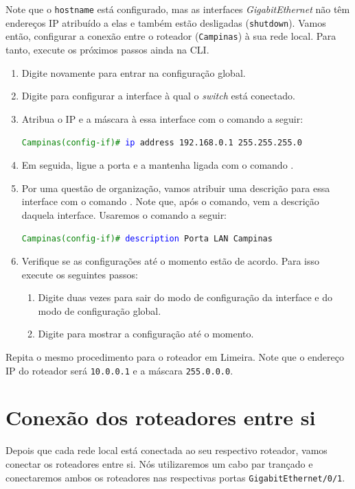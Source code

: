 Note que o \texttt{hostname} está configurado, mas as interfaces \textit{GigabitEthernet} não têm endereços IP atribuído a elas e também estão desligadas (\texttt{shutdown}). Vamos então, configurar a conexão entre o roteador (\texttt{Campinas}) à sua rede local. Para tanto, execute  os próximos passos ainda na CLI.

\begin{enumerate}[label*=\arabic*.]
    \item Digite novamente  para entrar na configuração global. 
    \item Digite  para configurar a interface à qual o \textit{switch} está conectado.
    \item Atribua o IP e a máscara à essa interface com o comando a seguir:
    
       \texttt{\textcolor{green}{Campinas(config-if)\#} \textcolor{blue}{ip} address 192.168.0.1 255.255.255.0}

    \item Em seguida, ligue a porta e a mantenha ligada com o comando .
    \item Por uma questão de organização, vamos atribuir uma descrição para essa interface com o comando . Note que, após o comando, vem a descrição daquela interface. Usaremos o comando a seguir:
    
       \texttt{\textcolor{green}{Campinas(config-if)\#} \textcolor{blue}{description} Porta LAN Campinas}
       
    \item Verifique se as configurações até o momento estão de acordo. Para isso execute os seguintes passos:
    \begin{enumerate}[label*=\arabic*.]
        \item Digite   duas vezes para sair do modo de configuração da interface e do modo de configuração global.
        \item Digite  para mostrar a configuração até o momento.
    \end{enumerate}
\end{enumerate}

Repita o mesmo procedimento para o roteador em Limeira. Note que o endereço IP do roteador será \texttt{10.0.0.1} e a máscara \texttt{255.0.0.0}.

\section{Conexão dos roteadores entre si}\label{subsec:conexaoRoteadores}
Depois que cada rede local está conectada ao seu respectivo roteador, vamos conectar os roteadores entre si. Nós utilizaremos um cabo par trançado e conectaremos ambos os roteadores nas respectivas portas \texttt{Gi\-ga\-bit\-Ether\-net/0/1}.

